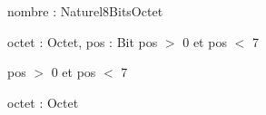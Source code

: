\begin{algorithme}
        
        {nombre : Naturel8Bits}{Octet}
        {}

        {octet : Octet, pos : \naturelNonNul}{Bit}
        {pos $>$ 0 et pos $<$ 7}
    
        {
        }
        {pos $>$ 0 et pos $<$ 7}
    
        {octet : Octet}{\naturel}
        {}

\end{algorithme}
 
